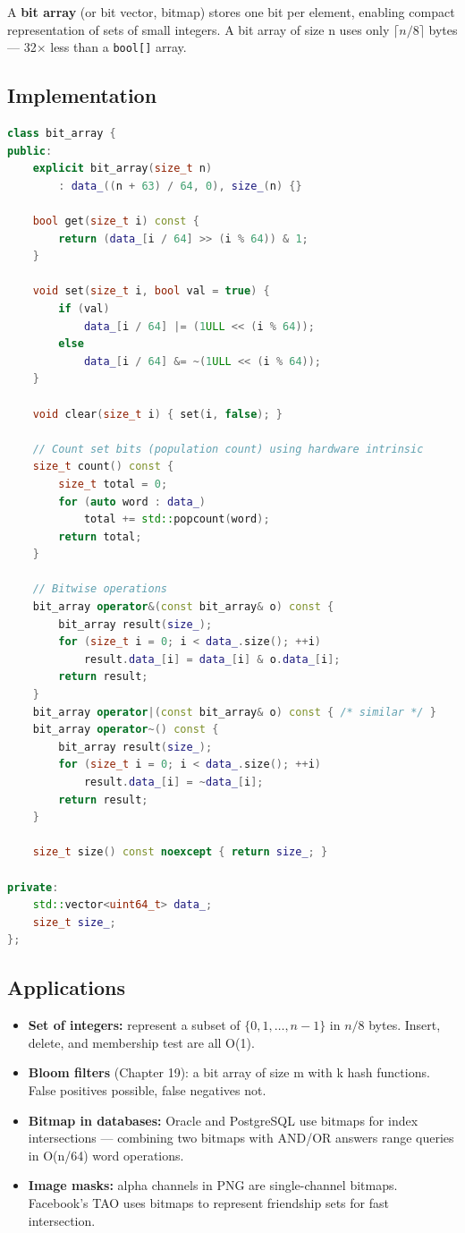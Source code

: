 A \textbf{bit array} (or bit vector, bitmap) stores one bit per element, enabling compact representation of sets of small integers. A bit array of size n uses only $\lceil n/8 \rceil$ bytes — 32$\times$ less than a \texttt{bool[]} array.

\subsection{Implementation}

\begin{lstlisting}[language=C++]
class bit_array {
public:
    explicit bit_array(size_t n)
        : data_((n + 63) / 64, 0), size_(n) {}

    bool get(size_t i) const {
        return (data_[i / 64] >> (i % 64)) & 1;
    }

    void set(size_t i, bool val = true) {
        if (val)
            data_[i / 64] |= (1ULL << (i % 64));
        else
            data_[i / 64] &= ~(1ULL << (i % 64));
    }

    void clear(size_t i) { set(i, false); }

    // Count set bits (population count) using hardware intrinsic
    size_t count() const {
        size_t total = 0;
        for (auto word : data_)
            total += std::popcount(word);
        return total;
    }

    // Bitwise operations
    bit_array operator&(const bit_array& o) const {
        bit_array result(size_);
        for (size_t i = 0; i < data_.size(); ++i)
            result.data_[i] = data_[i] & o.data_[i];
        return result;
    }
    bit_array operator|(const bit_array& o) const { /* similar */ }
    bit_array operator~() const {
        bit_array result(size_);
        for (size_t i = 0; i < data_.size(); ++i)
            result.data_[i] = ~data_[i];
        return result;
    }

    size_t size() const noexcept { return size_; }

private:
    std::vector<uint64_t> data_;
    size_t size_;
};
\end{lstlisting}

\subsection{Applications}

\begin{itemize}
\item \textbf{Set of integers:} represent a subset of $\{0, 1, \ldots, n-1\}$ in $n/8$ bytes. Insert, delete, and membership test are all O(1).
\item \textbf{Bloom filters} (Chapter 19): a bit array of size m with k hash functions. False positives possible, false negatives not.
\item \textbf{Bitmap in databases:} Oracle and PostgreSQL use bitmaps for index intersections — combining two bitmaps with AND/OR answers range queries in O(n/64) word operations.
\item \textbf{Image masks:} alpha channels in PNG are single-channel bitmaps. Facebook's TAO uses bitmaps to represent friendship sets for fast intersection.
\end{itemize}

